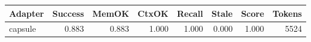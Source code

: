 \begin{tabular}{lrrrrrrr}
\hline
Adapter & Success & MemOK & CtxOK & Recall & Stale & Score & Tokens \\
\hline
capsule & 0.883 & 0.883 & 1.000 & 1.000 & 0.000 & 1.000 & 5524 \\
\hline
\end{tabular}
